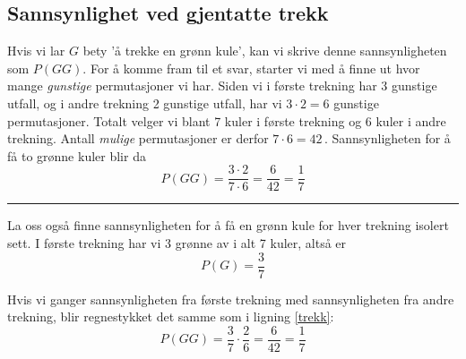 \subsection{Sannsynlighet ved gjentatte trekk}
 \qquad
{}
Hvis vi lar $ G $ bety 'å trekke en grønn kule', kan vi skrive denne sannsynligheten som $ P(GG) $. For å komme fram til et svar, starter vi med å finne ut hvor mange \textsl{gunstige} permutasjoner vi har. Siden vi i første trekning har 3 gunstige utfall, og i andre trekning 2 gunstige utfall, har vi $3\cdot2=6$ gunstige permutasjoner. Totalt velger vi blant 7 kuler i første trekning og 6 kuler i andre trekning. Antall \textsl{mulige} permutasjoner er derfor $7\cdot6=42$\,. Sannsynligheten for å få to grønne kuler blir da
\begin{equation}
P(GG)=\frac{3\cdot2}{7\cdot6}=\frac{6}{42}=\frac{1}{7} \label{trekk}
\end{equation}
\rule{\linewidth}{1pt}
La oss også finne sannsynligheten for å få en grønn kule for hver trekning isolert sett. I første trekning har vi 3 grønne av i alt 7 kuler, altså er
\[ P(G)=\frac{3}{7} \]
\qquad
{}


Hvis vi ganger sannsynligheten fra første trekning med sannsynligheten fra andre trekning, blir regnestykket det samme som i ligning \eqref{trekk}:
\[ P(GG)=\frac{3}{7}\cdot\frac{2}{6}=\frac{6}{42}=\frac{1}{7} \]


